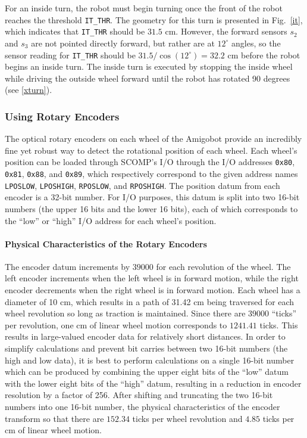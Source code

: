 For an inside turn, the robot must begin turning once the front of the
robot reaches the threshold \verb+IT_THR+. The geometry for this turn is
presented in Fig.~\ref{it}, which indicates that \verb+IT_THR+ should
be \(31.5\) cm. However, the forward sensors \(s_2\) and \(s_3\) are
not pointed directly forward, but rather are at \(12^\circ\) angles,
so the sensor reading for \verb+IT_THR+ should be
\(31.5/\cos(12^\circ)=32.2\) cm before the robot begins an inside
turn. The inside turn is executed by stopping the inside wheel while
driving the outside wheel forward until the robot has rotated 90
degrees (see \ref{xturn}). 

\subsubsection{Using Rotary Encoders}

The optical rotary encoders on each wheel of the Amigobot provide an
incredibly fine yet robust way to detect the rotational position of
each wheel. Each wheel's position can be loaded through SCOMP's
I/O through the I/O addresses \verb+0x80+, \verb+0x81+, \verb+0x88+, and
\verb+0x89+, which respectively correspond to the given address names
\verb+LPOSLOW+, \verb+LPOSHIGH+, \verb+RPOSLOW+, and \verb+RPOSHIGH+. The position
datum from each encoder is a 32-bit number. For I/O purposes, this datum
is split into two 16-bit numbers (the upper 16 bits and the lower 16
bits), each of which corresponds to the ``low'' or ``high'' I/O
address for each wheel's position.

\paragraph{Physical Characteristics of the Rotary Encoders}
The encoder datum increments by \(39000\) for each revolution of the
wheel. The left encoder increments when the left wheel is in forward
motion, while the right encoder decrements when the right wheel is in
forward motion. Each wheel has a diameter of 10 cm, which results in a
path of 31.42 cm being traversed for each wheel revolution so long as
traction is maintained. Since there are \(39000\) ``ticks'' per
revolution, one cm of linear wheel motion corresponds to \(1241.41\)
ticks. This results in large-valued encoder data for relatively short
distances. In order to simplify calculations and prevent bit carries
between two 16-bit numbers (the high and low data), it is best to
perform calculations on a single 16-bit number which can be produced
by combining the upper eight bits of the ``low'' datum with the lower
eight bits of the ``high'' datum, resulting in a reduction in encoder
resolution by a factor of 256.  After shifting and truncating the two
16-bit numbers into one 16-bit number, the physical characteristics of
the encoder transform so that there are \(152.34\) ticks per wheel
revolution and \(4.85\) ticks per cm of linear wheel motion.


